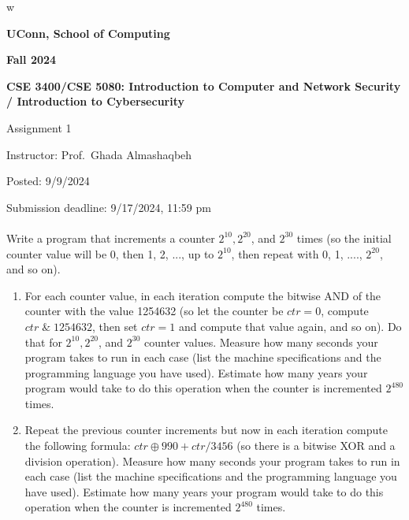 w\documentclass[12pt]{article}
\newcommand{\handout}[2]{
\renewcommand{\thepage}{\footnotesize CSE 3400/CSE 5850, #1, p. \arabic{page}}
\begin{center}

\noindent
{\bf UConn, School of Computing}

\noindent
{\bf Fall 2024}

\noindent
{\bf CSE 3400/CSE 5080: Introduction to Computer and Network Security \\/ Introduction to Cybersecurity}
\end{center}

\begin{center}
{\Large #1}
\end{center}
}
\begin{document}
\handout{Assignment 1}{}

\noindent
{Instructor: Prof.~Ghada Almashaqbeh}

\noindent
{Posted: 9/9/2024}

\noindent
{Submission deadline: 9/17/2024, 11:59 pm} \\\\


Write a program that increments a counter $2^{10}, 2^{20}$, and $2^{30}$ times (so the initial counter value will be 0, then 1, 2, ..., up to $2^{10}$, then repeat with 0, 1, ...., $2^{20}$, and so on). 
\begin{enumerate}
\item For each counter value, in each iteration compute the bitwise AND of the counter with the value 1254632 (so let the counter be $ctr = 0$, compute $ctr \; \& \; 1254632$, then set $ctr = 1$ and compute that value again, and so on). Do that for $2^{10}, 2^{20}$, and $2^{30}$ counter values. Measure how many seconds your program takes to run in each case (list the machine specifications and the programming language you have used). Estimate how many years your program would take to do this operation when the counter is incremented $2^{480}$ times.

\item Repeat the previous counter increments but now in each iteration compute the following formula: $ctr \oplus 990 +  ctr/3456$ (so there is a bitwise XOR and a division operation). Measure how many seconds your program takes to run in each case (list the machine specifications and the programming language you have used). Estimate how many years your program would take to do this operation when the counter is incremented $2^{480}$ times. 
\end{enumerate}


\end{document}
